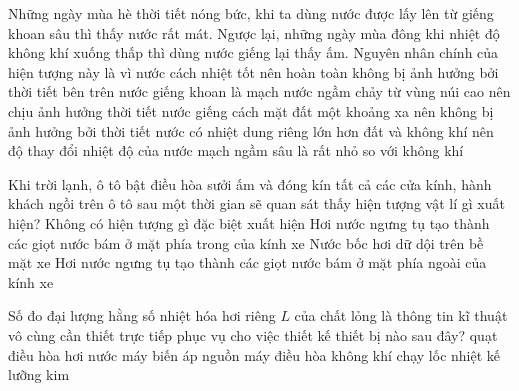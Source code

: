 \begin{ex}	Những ngày mùa hè thời tiết nóng bức, khi ta dùng nước được lấy lên từ giếng khoan sâu thì thấy nước rất mát. Ngược lại, những ngày mùa đông khi nhiệt độ không khí xuống thấp thì dùng nước giếng lại thấy ấm. Nguyên nhân chính của hiện tượng này là vì
	\choice
	{nước cách nhiệt tốt nên hoàn toàn không bị ảnh hưởng bởi thời tiết bên trên}
	{nước giếng khoan là mạch nước ngầm chảy từ vùng núi cao nên chịu ảnh hưởng thời tiết}
	{nước giếng cách mặt đất một khoảng xa nên không bị ảnh hưởng bởi thời tiết}
	{\True nước có nhiệt dung riêng lớn hơn đất và không khí nên độ thay đổi nhiệt độ của nước mạch ngầm sâu là rất nhỏ so với không khí}
\end{ex}

\begin{ex}	Khi trời lạnh, ô tô bật điều hòa sưởi ấm và đóng kín tất cả các cửa kính, hành khách ngồi trên ô tô sau một thời gian sẽ quan sát thấy hiện tượng vật lí gì xuất hiện?
	\choice
	{Không có hiện tượng gì đặc biệt xuất hiện}
	{\True Hơi nước ngưng tụ tạo thành các giọt nước bám ở mặt phía trong của kính xe}
	{Nước bốc hơi dữ dội trên bề mặt xe}
	{Hơi nước ngưng tụ tạo thành các giọt nước bám ở mặt phía ngoài của kính xe}
\end{ex}

\begin{ex}	Số đo đại lượng hằng số nhiệt hóa hơi riêng $L$ của chất lỏng là thông tin kĩ thuật vô cùng cần thiết trực tiếp phục vụ cho việc thiết kế thiết bị nào sau đây?
	\choice
	{\True quạt điều hòa hơi nước}
	{máy biến áp nguồn}
	{máy điều hòa không khí chạy lốc}
	{nhiệt kế lưỡng kim}
\end{ex}

